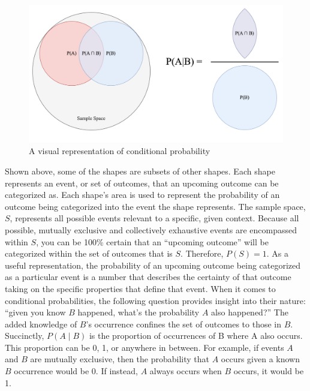 \documentclass[12pt]{article}
\begin{document}
\begin{figure}[h!]
\centering
\includegraphics[width=1.0\textwidth]{assets/visual_1.png} 
\caption{A visual representation of conditional probability}
\label{fig:cond_prob}
\end{figure}

\noindent Shown above, some of the shapes are subsets of other shapes. Each shape represents an event, or set of outcomes, that an upcoming outcome can be categorized as. Each shape’s area is used to represent the probability of an outcome being categorized into the event the shape represents. The sample space, $S$, represents all possible events relevant to a specific, given context. Because all possible, mutually exclusive and collectively exhaustive events are encompassed within $S$, you can be 100\% certain that an “upcoming outcome” will be categorized within the set of outcomes that is $S$. Therefore, $P(S) = 1$. As a useful representation, the probability of an upcoming outcome being categorized as a particular event is a number that describes the certainty of that outcome taking on the specific properties that define that event. When it comes to conditional probabilities, the following question provides insight into their nature: “given you know $B$ happened, what’s the probability $A$ also happened?” The added knowledge of $B$’s occurrence confines the set of outcomes to those in $B$. Succinctly, $P(A \mid B)$ is the proportion of occurrences of B where A also occurs. This proportion can be 0, 1, or anywhere in between. For example, if events $A$ and $B$ are mutually exclusive, then the probability that $A$ occurs given a known $B$ occurrence would be 0. If instead, $A$ always occurs when $B$ occurs, it would be 1.	
\end{document}
